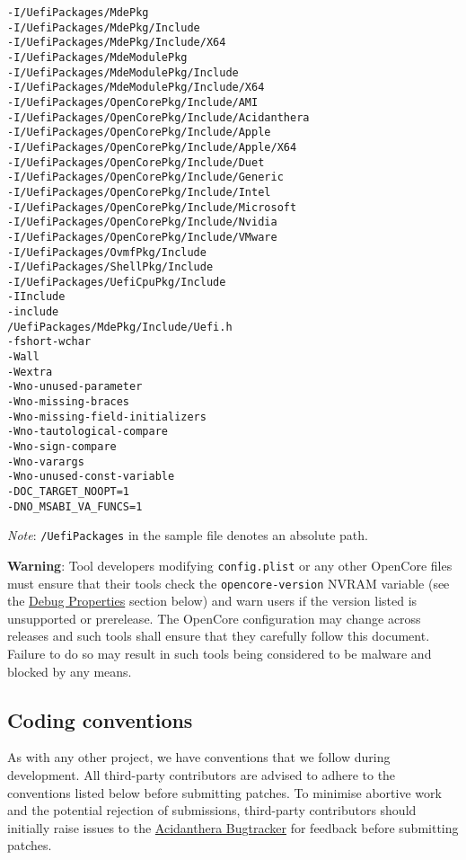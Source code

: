 \documentclass[]{article}
\makeatletter
\renewcommand{\label}[1]{%
\zref@wrapper@immediate{\oldlabel{#1}}}  %
\makeatother
\begin{document}
\begin{lstlisting}[caption=ECC Configuration, label=eccfile, style=ocbash]
-I/UefiPackages/MdePkg
-I/UefiPackages/MdePkg/Include
-I/UefiPackages/MdePkg/Include/X64
-I/UefiPackages/MdeModulePkg
-I/UefiPackages/MdeModulePkg/Include
-I/UefiPackages/MdeModulePkg/Include/X64
-I/UefiPackages/OpenCorePkg/Include/AMI
-I/UefiPackages/OpenCorePkg/Include/Acidanthera
-I/UefiPackages/OpenCorePkg/Include/Apple
-I/UefiPackages/OpenCorePkg/Include/Apple/X64
-I/UefiPackages/OpenCorePkg/Include/Duet
-I/UefiPackages/OpenCorePkg/Include/Generic
-I/UefiPackages/OpenCorePkg/Include/Intel
-I/UefiPackages/OpenCorePkg/Include/Microsoft
-I/UefiPackages/OpenCorePkg/Include/Nvidia
-I/UefiPackages/OpenCorePkg/Include/VMware
-I/UefiPackages/OvmfPkg/Include
-I/UefiPackages/ShellPkg/Include
-I/UefiPackages/UefiCpuPkg/Include
-IInclude
-include
/UefiPackages/MdePkg/Include/Uefi.h
-fshort-wchar
-Wall
-Wextra
-Wno-unused-parameter
-Wno-missing-braces
-Wno-missing-field-initializers
-Wno-tautological-compare
-Wno-sign-compare
-Wno-varargs
-Wno-unused-const-variable
-DOC_TARGET_NOOPT=1
-DNO_MSABI_VA_FUNCS=1
\end{lstlisting}

\emph{Note}: \texttt{/UefiPackages} in the sample file denotes an absolute path.

\textbf{Warning}: Tool developers modifying \texttt{config.plist} or any other OpenCore
files must ensure that their tools check the \texttt{opencore-version} NVRAM variable
(see the \hyperref[miscdebugprops]{Debug Properties} section below) and warn users
if the version listed is unsupported or prerelease. The OpenCore configuration may change
across releases and such tools shall ensure that they carefully follow this document. Failure
to do so may result in such tools being considered to be malware and blocked by any means.

\subsection{Coding conventions}\label{configuration-conv}

As with any other project, we have conventions that we follow during development.
All third-party contributors are advised to adhere to the conventions listed below
before submitting patches. To minimise abortive work and the potential rejection of
submissions, third-party contributors should initially raise issues to the
\href{https://github.com/acidanthera/bugtracker}{Acidanthera Bugtracker}
for feedback before submitting patches.
\end{document}

